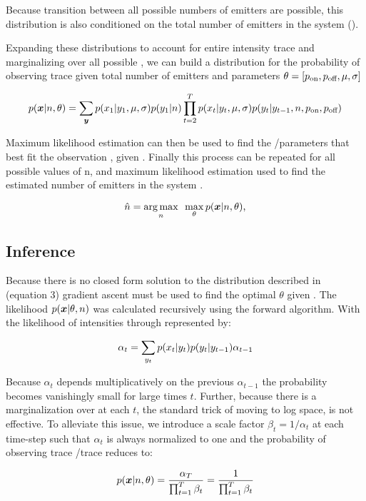 Because transition between all possible numbers of emitters are possible, this distribution is also conditioned on the total number of emitters in the system (\n).

Expanding these distributions to account for entire intensity trace \trace and marginalizing over all possible \states, we can build a distribution for the probability of observing trace \trace given total number of emitters \n and parameters $\theta = [p_\text{on}, p_\text{off}, \mu, \sigma]$

\begin{equation}
  p(\bm{x}|n,\theta) =
    \sum_{\bm{y}}
    p(x_{1}|y_{1}, \mu, \sigma) p(y_{1}|n)
    \prod_{t=2}^{T}
    p(x_{t}|y_{t}, \mu, \sigma) p(y_{t}|y_{t-1},n, p_\text{on}, p_\text{off})
\end{equation}

Maximum likelihood estimation can then be used to find the /parameters that best fit the observation \trace, given \n. 
Finally this process can be repeated for all possible values of n, and maximum likelihood estimation used to find the estimated number of emitters in the system \estimatedn.

\begin{equation}
    \hat{n} =
    \mathop{\arg\max}_{n}\hspace{0.5em}
    \max_\theta
    p(\bm{x}|n,\theta)
  \text{,}
\end{equation}

\subsection{Inference}


Because there is no closed form solution to the distribution described in (equation 3) gradient ascent must be used to find the optimal $\theta$ given \n.
The likelihood $p(\bm{x} | \theta, n)$ was calculated recursively using the forward algorithm. 
With the likelihood of intensities  through  represented by:

\begin{equation}
	\alpha_{t} = \sum_{y_{t}} p(x_{t} | y_{t}) p(y_{t} | y_{t-1}) \alpha_{t-1}
\end{equation}

Because $\alpha_{t}$ depends multiplicatively on the previous $\alpha_{t-1}$ the probability becomes vanishingly small for large times $t$. Further, because there is a marginalization over \states at each $t$, the standard trick of moving to log space, is not effective. To alleviate this issue, we introduce a scale factor $\beta_{t} = 1 / \alpha_{t}$ at each time-step such that $\alpha_{t}$ is always normalized to one and the probability of observing trace /trace reduces to:

\begin{equation}
	p(\bm{x} | n, \theta) = \frac{\alpha_{T}}{\prod_{t=1}^{T}\beta_{t}} = \frac{1}{\prod_{t=1}^{T}\beta_{t}}
\end{equation}

